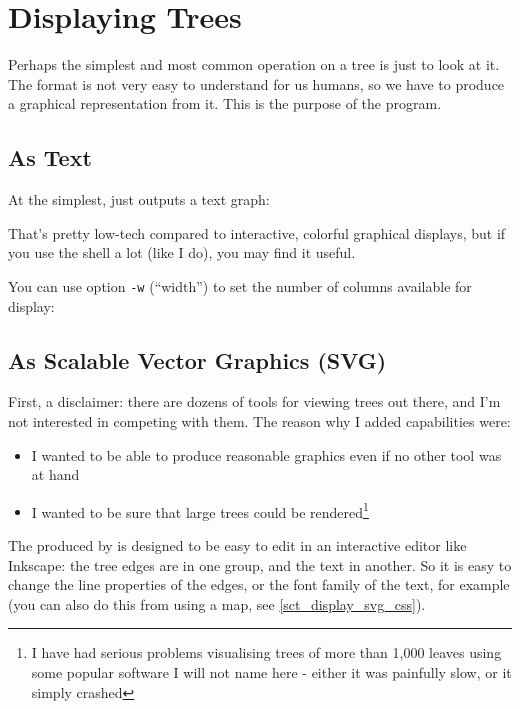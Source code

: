 
\section{Displaying Trees}
\label{sct_display}

Perhaps the simplest and most common operation on a \nw{} tree is just to look at it. The \nw{} format is not very easy to understand for us humans, so we have to produce a graphical representation from it. This is the purpose of the \display{} program. 

\subsection{As Text}
\label{sct_display_text}

At the simplest, \display{} just outputs a text graph:

\begin{samepage}

\end{samepage}
That's pretty low-tech compared to interactive, colorful graphical displays,
but if you use the shell a lot (like I do), you may find it useful.

You can use option \texttt{-w} (``width'') to set the number of columns available for display:


\begin{samepage}

\end{samepage}

\subsection{As Scalable Vector Graphics (SVG)}
\label{sct_display_svg}

First, a disclaimer: there are dozens of tools for viewing trees out there, and I'm not interested in competing with them. The reason why I added \svg{} capabilities were:
\begin{itemize}
 \item I wanted to be able to produce reasonable graphics even if no other tool was at hand
 \item I wanted to be sure that large trees could be rendered\footnote{I have had serious problems visualising trees of more than 1,000 leaves using some popular software I will not name here - either it was painfully slow, or it simply crashed} 
\end{itemize}
The \svg{} produced by \display{} is designed to be easy to edit in an
interactive editor like Inkscape: the tree edges are in one group, and the text
in another. So it is easy to change the line properties of the edges, or the
font family of the text, for example (you can also do this from \display{}
using a \css{} map, see \ref{sct_display_svg_css}).

